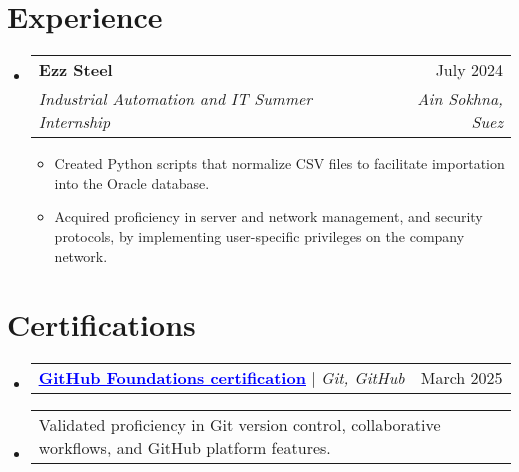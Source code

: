 \documentclass[letterpaper,11pt]{article}
\makeatletter
\newcommand{\resumeItem}[1]{
  \item\small{
    {#1 \vspace{-2pt}}
  }
}
\newcommand{\resumeSubheading}[4]{
  \vspace{-2pt}\item
    \begin{tabular*}{0.97\textwidth}[t]{l@{\extracolsep{\fill}}r}
      \textbf{#1} & #2 \\
      \textit{\small#3} & \textit{\small #4} \\
    \end{tabular*}\vspace{-7pt}
}
\newcommand{\resumeProjectHeading}[2]{
    \item
    \begin{tabular*}{0.97\textwidth}{l@{\extracolsep{\fill}}r}
      \small#1 & #2 \\
    \end{tabular*}\vspace{-7pt}
}
\newcommand{\resumeSubHeadingListStart}{\begin{itemize}[leftmargin=0.15in, label={}]}
\newcommand{\resumeSubHeadingListEnd}{\end{itemize}}
\newcommand{\resumeItemListStart}{\begin{itemize}}
\newcommand{\resumeItemListEnd}{\end{itemize}\vspace{-5pt}}
\makeatother
\begin{document}
\section{Experience}
  \resumeSubHeadingListStart

    \resumeSubheading
      {Ezz Steel}{July 2024}
      {Industrial Automation and IT Summer Internship}{Ain Sokhna, Suez}
      \resumeItemListStart
        \resumeItem{Created Python scripts that normalize CSV files to facilitate importation into the Oracle database.}
        \resumeItem{Acquired proficiency in server and network management, and security protocols, by implementing user-specific privileges on the company network.}
      \resumeItemListEnd

  \resumeSubHeadingListEnd
\vspace{-16pt}


\section{Certifications}
    \resumeSubHeadingListStart
      \resumeProjectHeading
          {\href{https://www.credly.com/badges/a2c4111c-d3f4-4850-ae99-361e7489ac06}{\textcolor{blue}{\underline{\textbf{GitHub Foundations certification}}}} $|$ \emph{Git, GitHub}}{March 2025}
      \resumeProjectHeading
          {\small Validated proficiency in Git version control, collaborative workflows, and GitHub platform features.}{}
    \resumeSubHeadingListEnd



\end{document}
